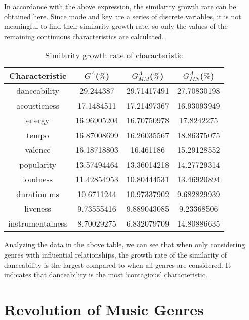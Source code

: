 \documentclass{mcmthesis}
\begin{document}
In accordance with the above expression, the similarity growth rate can be obtained here. Since mode and key are a series of discrete variables, it is not meaningful to find their similarity growth rate, so only the values of the remaining continuous characteristics are calculated.
\begin{table}[H]
	\centering  
	\caption{Similarity growth rate of characteristic}
	
	\label{table_time}
	
	\begin{tabular}{cccc}  
		
		\toprule   
		
		Characteristic&${G^A}$($\%$) &$G_{MM}^A$($\%$)&$G_{MN}^A$($\%$) \\ 
		\midrule    
		danceability&29.244387&29.71417491
		&27.70830198
		\\  
		acousticness&17.1484511&17.21497367
		&16.93093949
		\\ 
		energy& 16.96905204
		&16.70750978&17.8242275\\
		tempo&	16.87008699&	16.26035567	&18.86375075
		\\      
		valence	&16.18718803&	16.461186&	15.29128552
		 \\
		 popularity	&13.57494464&	13.36014218&	14.27729314
		 \\
		 loudness&	11.42854953&	10.80444531&	13.46920894
		 \\
		 duration$\_$ms&	10.6711244&	10.97337902&	9.682829939
		 \\
		 liveness&	9.73555416&	9.889043085&	9.23368506
		 \\
		 instrumentalness&	8.70029275&	6.832079709&	14.80886635
		 \\
		\bottomrule  
		
	\end{tabular}
\end{table}
Analyzing the data in the above table, we can see that when only considering genres with influential relationships, the growth rate of the similarity of danceability is the largest compared to when all genres are considered. It indicates that danceability is the most ‘contagious’ characteristic.
\section{Revolution of Music Genres}
\end{document}
